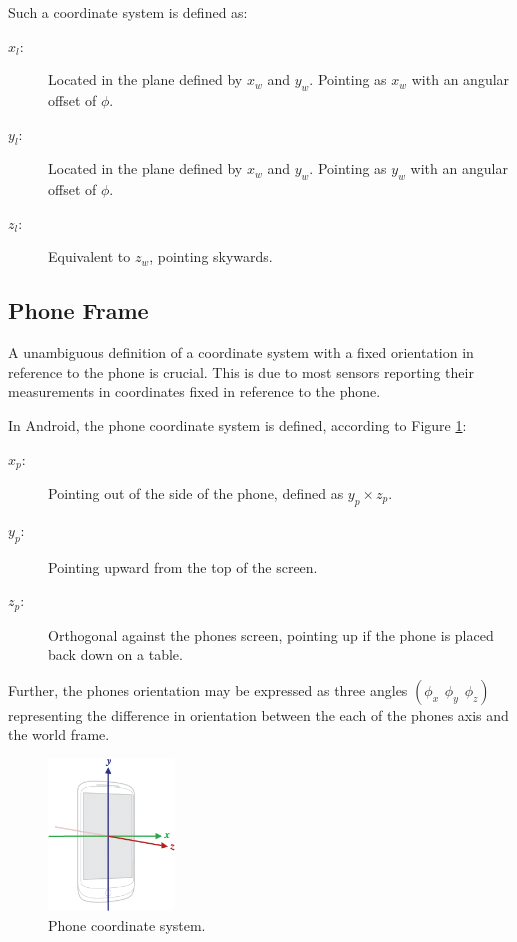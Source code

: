 \documentclass{LTHthesis}
\begin{document}
Such a coordinate system is defined as:
%
\begin{description}
\item[$x_l$:] Located in the plane defined by $x_w$ and $y_w$. Pointing as $x_w$ with an angular offset of $\phi$.
\item[$y_l$:] Located in the plane defined by $x_w$ and $y_w$. Pointing as $y_w$ with an angular offset of $\phi$.
\item[$z_l$:] Equivalent to $z_w$, pointing skywards.
\end{description}
%
\subsection{Phone Frame}
%
A unambiguous definition of a coordinate system with a fixed orientation in reference to the phone is crucial. This is due to most sensors reporting their measurements in coordinates fixed in reference to the phone. 

In Android, the phone coordinate system is defined, according to Figure \ref{axis_device}: 
%
\begin{description}
\item[$x_p$:] Pointing out of the side of the phone, defined as $y_p \times z_p$.
\item[$y_p$:] Pointing upward from the top of the screen.
\item[$z_p$:] Orthogonal against the phones screen, pointing up if the phone is placed back down on a table.
\end{description}
%
Further, the phones orientation may be expressed as three angles $(\phi_x \hspace{5pt} \phi_y \hspace{5pt} \phi_z)$ representing the difference in orientation between the each of the phones axis and the world frame.
%
\begin{figure}[!hbt]
\begin{center}

\includegraphics[width=0.3\textwidth ]{images/background_on_navigation/axis_device.png}
\end{center}
\caption[]{Phone coordinate system.\footnotemark }\label{axis_device}
\end{figure}
\end{document}
